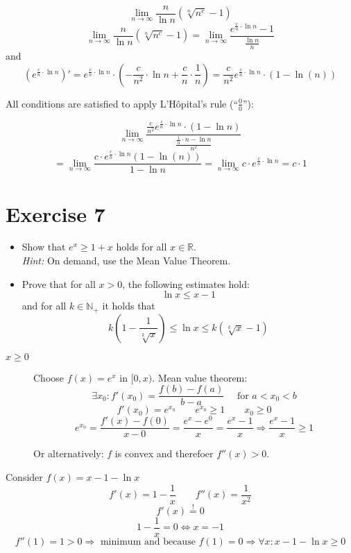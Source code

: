 \documentclass[a4paper]{article}
\theoremstyle{definition}
\begin{document}
\[ \lim_{n\to\infty} \frac{n}{\ln{n}} \left(\sqrt[n]{n^c} - 1\right) \]
\[
  \lim_{n\to\infty} \frac{n}{\ln{n}} \left(\sqrt[n]{n^c} - 1\right)
    = \lim_{n\to\infty} \frac{e^{\frac cn \cdot \ln{n}} - 1}{\frac{\ln{n}}{n}}
\]
and
\[
  \left(e^{\frac cn \cdot \ln{n}}\right)'
    = e^{\frac cn \cdot \ln{n}} \cdot \left(-\frac c{n^2} \cdot \ln{n} + \frac cn \cdot \frac1n\right)
    = \frac c{n^2} e^{\frac cn \cdot \ln{n}} \cdot (1 - \ln(n))
\]

All conditions are satisfied to apply L'H\^opital's rule (\enquote{$\frac00$}):

\[
  \lim_{n\to\infty} \frac{\frac c{n^2} e^{\frac cn \cdot \ln{n}} \cdot (1 - \ln{n})}{\frac{\frac{1}{n} \cdot n - \ln{n}}{n^2}}
\] \[
  = \lim_{n\to\infty} \frac{c \cdot e^{\frac cn \cdot \ln{n}} (1 - \ln(n))}{1 - \ln{n}}
  = \lim_{n\to\infty} c \cdot e^{\frac cn \cdot \ln{n}}
  = c \cdot 1
\]

\section{Exercise 7}
\begin{ex}
  \begin{itemize}
    \item Show that $e^x \geq 1 + x$ holds for all $x \in \mathbb R$. \\
      \emph{Hint:} On demand, use the Mean Value Theorem.
    \item Prove that for all $x > 0$, the following estimates hold:
      \[ \ln{x} \leq x - 1 \]
      and for all $k \in \mathbb N_+$ it holds that
      \[ k\left(1 - \frac{1}{\sqrt[k]{x}}\right) \leq \ln{x} \leq k \left(\sqrt[k]{x} - 1\right) \]
  \end{itemize}
\end{ex}

\begin{description}
  \item[$x \geq 0$]
    Choose $f(x) = e^x$ in $[0,x)$. Mean value theorem:
    \[ \exists x_0: f'(x_0) = \frac{f(b) - f(a)}{b - a} \quad \text{ for } a < x_0 < b \]
    \[ f'(x_0) = e^{x_0}   \qquad   e^{x_0} \geq 1   \qquad   x_0 \geq 0 \]
    \[ e^{x_0} = \frac{f'(x) - f(0)}{x - 0} = \frac{e^x - e^0}{x} = \frac{e^x - 1}{x} \Rightarrow \frac{e^x - 1}{x} \geq 1 \]

    Or alternatively: $f$ is convex and therefoer $f''(x) > 0$.
\end{description}

Consider $f(x) = x - 1 - \ln{x}$
\[ f'(x) = 1 - \frac1x \qquad f''(x) = \frac1{x^2} \]
\[ f'(x) \stackrel!= 0 \]
\[ 1 - \frac1x = 0 \Leftrightarrow x = -1 \]
\[ f''(1) = 1 > 0 \Rightarrow \text{ minimum and because } f(1) = 0 \Rightarrow \forall x: x - 1 - \ln{x} \geq 0 \]
\end{document}
